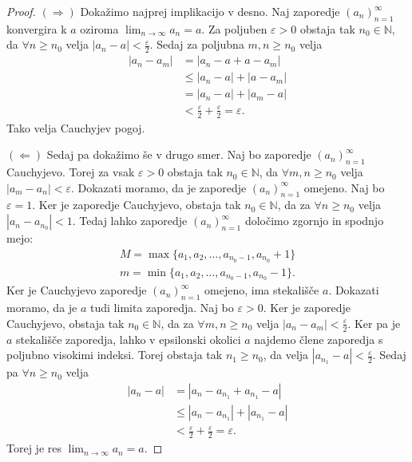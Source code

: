 \documentclass[10pt, a4paper]{article}
\newenvironment{noticeC}{%
  \tcolorbox[%
  notitle,
  empty,
  enhanced,  %
  breakable,
  coltext=black, 
  fontupper=\rmfamily,
  noparskip,
  sharp corners,
  boxrule=-1pt,  %
  frame hidden,
  left=7pt,  %
  right=7pt,
  top=5pt,
  bottom=5pt,
  before skip=2.5ex plus 2pt,
  after skip=2.5ex plus 2pt,
  overlay unbroken and last={%
  },
  ]}
{\endtcolorbox}
\newenvironment{dokaz}%
  {\begin{noticeC}\begin{proof}}%
  {\end{proof}\end{noticeC}}
\newcommand{\N}{\mathbb {N}}
\newcommand{\zap}[1]{(#1_n)_{n=1} ^{\infty}}
\newcommand{\limzap}[1]{\lim_{n \to \infty} {#1}}
\begin{document}
    \begin{dokaz}
        $(\Rightarrow)$ Dokažimo najprej implikacijo v desno. 
        Naj zaporedje $\zap{a}$ konvergira k $a$ oziroma $\limzap{a_n} = a.$ 
        Za poljuben $\varepsilon>0$ obstaja tak $n_0 \in \N$, da $\forall n \geq n_0$ velja 
        $|a_n - a|< \frac{\varepsilon}{2}.$ Sedaj za poljubna $m,n \geq n_0$ velja
        \begin{align*}
            |a_n - a_m| &= |a_n - a + a - a_m|\\
            &\leq |a_n - a| + |a- a_m|\\
            &= |a_n - a| + |a_m - a|\\
            &< \frac{\varepsilon}{2} + \frac{\varepsilon}{2} = \varepsilon.
        \end{align*}
        Tako velja Cauchyjev pogoj. 
        
        $(\Leftarrow)$ Sedaj pa dokažimo še v drugo smer. 
        Naj bo zaporedje $\zap{a}$ Cauchyjevo. 
        Torej za vsak $\varepsilon>0$ obstaja tak $n_0 \in \N$, da $\forall m,n \geq n_0$ velja
        $|a_m - a_n| < \varepsilon.$
            Dokazati moramo, da je zaporedje $\zap{a}$ omejeno. Naj bo $\varepsilon=1$. Ker je zaporedje Cauchyjevo, obstaja tak $n_0 \in \N$, da za $\forall n \geq n_0$ velja
            $|a_n -a_{n_0}| < 1.$ Tedaj lahko zaporedje $\zap{a}$ določimo zgornjo in spodnjo mejo:
            \begin{align*}
                M = \max \{a_1, a_2, \dots, a_{n_0-1}, a_{n_0}+1\}\\
                m = \min \{a_1, a_2, \dots, a_{n_0-1}, a_{n_0} - 1\}.
            \end{align*}
            Ker je Cauchyjevo zaporedje $\zap{a}$ omejeno, ima stekališče $a$. 
            Dokazati moramo, da je $a$ tudi limita zaporedja. Naj bo $\varepsilon>0$. Ker je zaporedje Cauchyjevo, obstaja tak $n_0 \in \N$, da za $\forall m,n \geq n_0$ velja
            $|a_n - a_m|< \frac{\varepsilon}{2}.$ 
            Ker pa je $a$ stekališče zaporedja, lahko v epsilonski okolici $a$ najdemo člene zaporedja s poljubno visokimi indeksi. Torej obstaja tak $n_1 \geq n_0$, da velja
            $|a_{n_1} - a| < \frac{\varepsilon}{2}.$ 
            Sedaj pa $\forall n \geq n_0$ velja
            \begin{align*}
                |a_n - a| &= |a_n - a_{n_1} + a_{n_1} - a|\\
                &\leq |a_n - a_ {n_1}| + |a_{n_1} - a|\\
                &< \frac{\varepsilon}{2} + \frac{\varepsilon}{2} = \varepsilon.
            \end{align*}
            Torej je res $\limzap{a_n} = a.$ \qedhere
    \end{dokaz}
\end{document}

